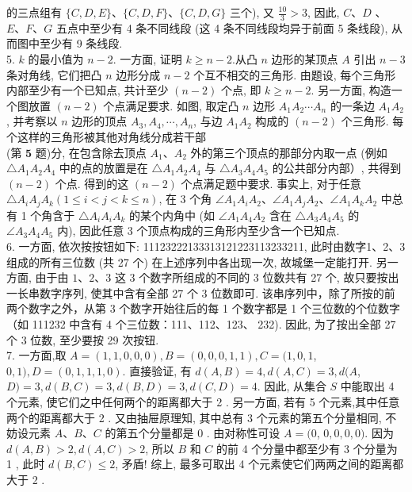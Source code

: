 \documentclass[10pt]{article}
\begin{document}
的三点组有 $\{C, D, E\} 、\{C, D, F\} 、\{C, D, G\}$ 三个), 又 $\frac{10}{3}>3$, 因此, $C 、 D$ 、 $E 、 F 、 G$ 五点中至少有 4 条不同线段 (这 4 条不同线段均异于前面 5 条线段), 从而图中至少有 9 条线段.\\
5. $k$ 的最小值为 $n-2$. 一方面, 证明 $k \geqslant n-2$.从凸 $n$ 边形的某顶点 $A$ 引出 $n-3$ 条对角线, 它们把凸 $n$ 边形分成 $n-2$ 个互不相交的三角形. 由题设, 每个三角形内部至少有一个已知点, 共计至少 $(n-2)$ 个点, 即 $k \geqslant n-2$. 另一方面, 构造一个图放置 $(n-2)$ 个点满足要求. 如图, 取定凸 $n$ 边形 $A_{1} A_{2} \cdots A_{n}$ 的一条边 $A_{1} A_{2}$, 并考察以 $n$ 边形的顶点 $A_{3}, A_{4}, \cdots, A_{n}$, 与边 $A_{1} A_{2}$ 构成的 $(n-2)$ 个三角形. 每个这样的三角形被其他对角线分成若干部\\
(第 $\mathbf{5}$ 题)分, 在包含除去顶点 $A_{1} 、 A_{2}$ 外的第三个顶点的那部分内取一点 (例如 $\triangle A_{1} A_{2} A_{4}$ 中的点的放置是在 $\triangle A_{1} A_{2} A_{4}$ 与 $\triangle A_{3} A_{4} A_{5}$ 的公共部分内部）, 共得到 $(n-2)$ 个点. 得到的这 $(n-2)$ 个点满足题中要求. 事实上, 对于任意 $\triangle A_{i} A_{j} A_{k}(1 \leqslant i<j<k \leqslant n)$, 在 3 个角 $\angle A_{1} A_{i} A_{2} 、 \angle A_{1} A_{j} A_{2} 、 \angle A_{1} A_{k} A_{2}$ 中总有 1 个角含于 $\triangle A_{i} A_{i} A_{k}$ 的某个内角中 (如 $\angle A_{1} A_{4} A_{2}$ 含在 $\triangle A_{3} A_{4} A_{5}$ 的 $\angle A_{3} A_{4} A_{5}$ 内), 因此任意 3 个顶点构成的三角形内至少含一个已知点.\\
6. 一方面, 依次按按钮如下: 11123222133313121223113233211, 此时由数字1、2、3 组成的所有三位数 (共 27 个) 在上述序列中各出现一次, 故城堡一定能打开. 另一方面, 由于由 $1 、 2 、 3$ 这 3 个数字所组成的不同的 3 位数共有 27 个, 故只要按出一长串数字序列, 使其中含有全部 27 个 3 位数即可. 该串序列中，除了所按的前两个数字之外，从第 3 个数字开始往后的每 1 个数字都是 1 个三位数的个位数字（如 111232 中含有 4 个三位数：111、112、123、 232). 因此, 为了按出全部 27 个 3 位数, 至少要按 29 次按钮.\\
7. 一方面,取 $A=(1,1,0,0,0), B=(0,0,0,1,1), C=(1,0,1$, $0,1), D=(0,1,1,1,0)$. 直接验证, 有 $d(A, B)=4, d(A, C)=3, d(A$, $D)=3, d(B, C)=3, d(B, D)=3, d(C, D)=4$. 因此, 从集合 $S$ 中能取出 4 个元素, 使它们之中任何两个的距离都大于 2 . 另一方面, 若有 5 个元素,其中任意两个的距离都大于 2 . 又由抽屉原理知, 其中总有 3 个元素的第五个分量相同, 不妨设元素 $A 、 B 、 C$ 的第五个分量都是 0 . 由对称性可设 $A=(0$, $0,0,0,0)$. 因为 $d(A, B)>2, d(A, C)>2$, 所以 $B$ 和 $C$ 的前 4 个分量中都至少有 3 个分量为 1 , 此时 $d(B, C) \leqslant 2$, 矛盾! 综上, 最多可取出 4 个元素使它们两两之间的距离都大于 2 .\\
\end{document}

